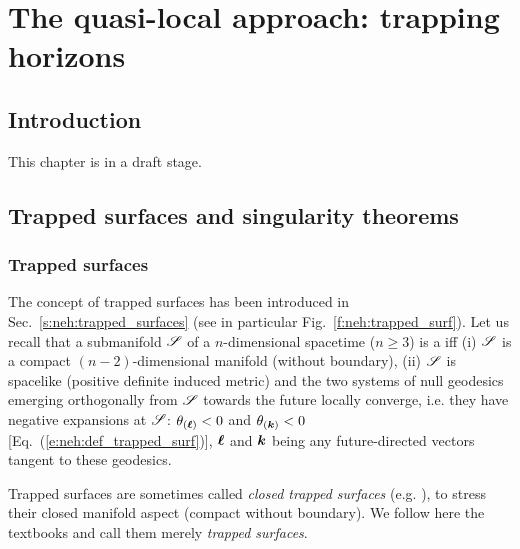 \chapter{The quasi-local approach: trapping horizons}
\label{s:loc}

\minitoc

\section{Introduction}

This chapter is in a draft stage.

\section{Trapped surfaces and singularity theorems}

\subsection{Trapped surfaces}

The concept of trapped surfaces has been introduced in Sec.~\ref{s:neh:trapped_surfaces}
(see in particular Fig.~\ref{f:neh:trapped_surf}). Let us recall that
a submanifold $\mathscr{S}$ of a $n$-dimensional spacetime ($n\ge 3$) is
a  iff (i) $\mathscr{S}$ is a compact $(n-2)$-dimensional manifold
(without boundary), (ii) $\mathscr{S}$ is spacelike (positive definite induced metric)
and the two systems of null geodesics emerging orthogonally from $\mathscr{S}$ towards the future
locally converge, i.e. they have negative expansions at $\mathscr{S}$:
$\theta_{(\bm{\ell})} < 0$ and $\theta_{(\bm{k})} < 0$ [Eq.~(\ref{e:neh:def_trapped_surf})],
$\bm{\ell}$ and $\bm{k}$ being
any future-directed vectors tangent to these geodesics.

\begin{remark}
Trapped surfaces are sometimes called
\emph{closed trapped surfaces} (e.g. \cite{Penro65,HawkiE73}),
to stress their closed manifold aspect (compact without boundary).
We follow here the textbooks \cite{MisneTW73,Wald84} and call them merely
\emph{trapped surfaces}.
\end{remark}

